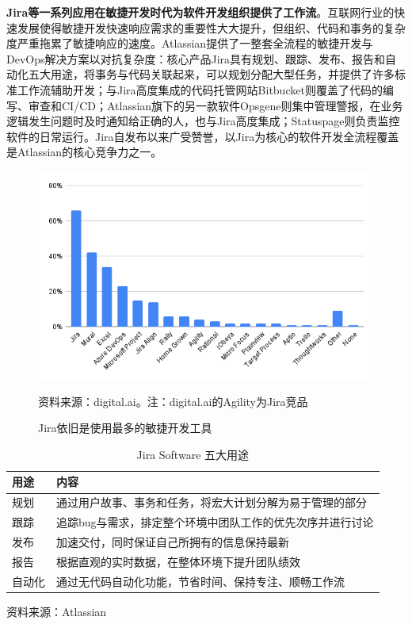 \textbf{Jira等一系列应用在敏捷开发时代为软件开发组织提供了工作流}。互联网行业的快速发展使得敏捷开发快速响应需求的重要性大大提升，但组织、代码和事务的复杂度严重拖累了敏捷响应的速度。Atlassian提供了一整套全流程的敏捷开发与DevOps解决方案以对抗复杂度：核心产品Jira具有规划、跟踪、发布、报告和自动化五大用途，将事务与代码关联起来，可以规划分配大型任务，并提供了许多标准工作流辅助开发；与Jira高度集成的代码托管网站Bitbucket则覆盖了代码的编写、审查和CI/CD；Atlassian旗下的另一款软件Opsgene则集中管理警报，在业务逻辑发生问题时及时通知给正确的人，也与Jira高度集成；Statuspage则负责监控软件的日常运行。Jira自发布以来广受赞誉，以Jira为核心的软件开发全流程覆盖是Atlassian的核心竞争力之一。
\begin{figure}[H]
    \caption{Jira依旧是使用最多的敏捷开发工具}
    \begin{center}
        \includegraphics[width=\linewidth]{img/popularity.png}
    \end{center}
    \footnotesize{资料来源：digital.ai。注：digital.ai的Agility为Jira竞品}
\end{figure}
\begin{table}[H]
    \caption{Jira Software 五大用途}
    \begin{tabular}{ll}
        \toprule
        用途  & 内容                             \\
        \midrule
        规划  & 通过用户故事、事务和任务，将宏大计划分解为易于管理的部分   \\
        跟踪  & 追踪bug与需求，排定整个环境中团队工作的优先次序并进行讨论 \\
        发布  & 加速交付，同时保证自己所拥有的信息保持最新          \\
        报告  & 根据直观的实时数据，在整体环境下提升团队绩效         \\
        自动化 & 通过无代码自动化功能，节省时间、保持专注、顺畅工作流     \\
        \bottomrule
    \end{tabular}
    \footnotesize{资料来源：Atlassian}
\end{table}

